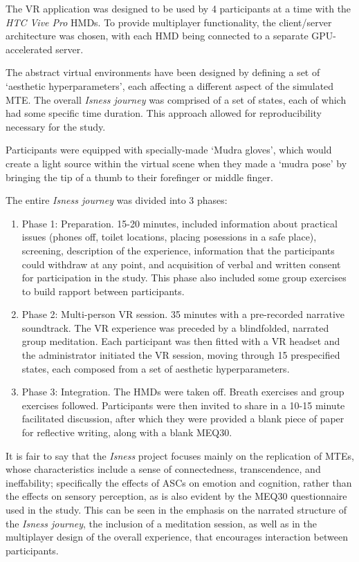 The \ac{VR} application was designed to be used by 4 participants at a time with the \textit{HTC Vive Pro} \acp{HMD}. To provide multiplayer functionality, the client/server architecture was chosen, with each \ac{HMD} being connected to a separate \acs{GPU}-accelerated server.

The abstract virtual environments have been designed by defining a set of `aesthetic hyperparameters', each affecting a different aspect of the simulated \ac{MTE}. The overall \textit{Isness journey} was comprised of a set of states, each of which had some specific time duration. This approach allowed for reproducibility necessary for the study.

Participants were equipped with specially-made `Mudra gloves', which would create a light source within the virtual scene when they made a `mudra pose' by bringing the tip of a thumb to their forefinger or middle finger.

The entire \textit{Isness journey} was divided into 3 phases:

\begin{enumerate}
    \item Phase 1: Preparation. 15-20 minutes, included information about practical issues (phones off, toilet locations, placing posessions in a safe place), screening, description of the experience, information that the participants could withdraw at any point, and acquisition of verbal and written consent for participation in the study. This phase also included some group exercises to build rapport between participants.
    \item Phase 2: Multi-person \ac{VR} session. 35 minutes with a pre-recorded narrative soundtrack. The \ac{VR} experience was preceded by a blindfolded, narrated group meditation. Each participant was then fitted with a VR headset and the administrator initiated the \ac{VR} session, moving through 15 prespecified states, each composed from a set of aesthetic hyperparameters.
    \item Phase 3: Integration. The \acp{HMD} were taken off. Breath exercises and group exercises followed. Participants were then invited to share in a 10-15 minute facilitated discussion, after which they were provided a blank piece of paper for reflective writing, along with a blank \ac{MEQ30}.
\end{enumerate}

It is fair to say that the \textit{Isness} project focuses mainly on the replication of \acp{MTE}, whose characteristics include a sense of connectedness, transcendence, and ineffability; specifically the effects of \acp{ASC} on emotion and cognition, rather than the effects on sensory perception, as is also evident by the \ac{MEQ30} questionnaire used in the study. This can be seen in the emphasis on the narrated structure of the \textit{Isness journey}, the inclusion of a meditation session, as well as in the multiplayer design of the overall experience, that encourages interaction between participants.

